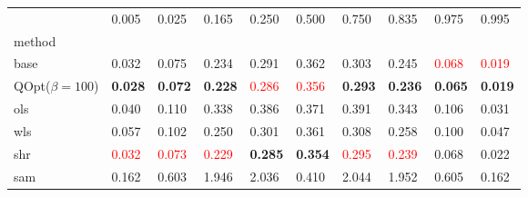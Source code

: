 \begin{tabular}{llllllllll}
\toprule
 & 0.005 & 0.025 & 0.165 & 0.250 & 0.500 & 0.750 & 0.835 & 0.975 & 0.995 \\
method &  &  &  &  &  &  &  &  &  \\
\midrule
base & 0.032 & 0.075 & 0.234 & 0.291 & 0.362 & 0.303 & 0.245 & \textcolor{red}{0.068} & \textcolor{red}{0.019} \\
\midrule
QOpt($\beta=100$) & \textbf{0.028} & \textbf{0.072} & \textbf{0.228} & \textcolor{red}{0.286} & \textcolor{red}{0.356} & \textbf{0.293} & \textbf{0.236} & \textbf{0.065} & \textbf{0.019} \\
ols & 0.040 & 0.110 & 0.338 & 0.386 & 0.371 & 0.391 & 0.343 & 0.106 & 0.031 \\
wls & 0.057 & 0.102 & 0.250 & 0.301 & 0.361 & 0.308 & 0.258 & 0.100 & 0.047 \\
shr & \textcolor{red}{0.032} & \textcolor{red}{0.073} & \textcolor{red}{0.229} & \textbf{0.285} & \textbf{0.354} & \textcolor{red}{0.295} & \textcolor{red}{0.239} & 0.068 & 0.022 \\
sam & 0.162 & 0.603 & 1.946 & 2.036 & 0.410 & 2.044 & 1.952 & 0.605 & 0.162 \\
\bottomrule
\end{tabular}